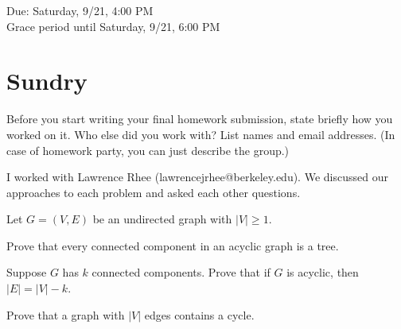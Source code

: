 \documentclass[11pt]{article}
\begin{document}
\maketitle
\fontsize{12}{15}\selectfont

\begin{center}
    Due: Saturday, 9/21, 4:00 PM \\
    Grace period until Saturday, 9/21, 6:00 PM \\
\end{center}

\section*{Sundry}
Before you start writing your final homework submission, state briefly how you worked on it.  Who else did you work with?  List names and email addresses.  (In case of homework party, you can just describe the group.)

\begin{solution}
  I worked with Lawrence Rhee (lawrencejrhee@berkeley.edu). 
  We discussed our approaches to each problem and asked each other questions.  
\end{solution}

\vspace{15pt}


Let $G = (V, E)$ be an undirected graph with $|V| \geq 1$.

\begin{Parts}

\Part Prove that every connected component in an acyclic graph is a tree.

\Part Suppose $G$ has $k$ connected components. Prove that if $G$ is acyclic, then $|E| = |V| - k$.

\Part Prove that a graph with $|V|$ edges contains a cycle. 

\end{Parts}
\end{document}
